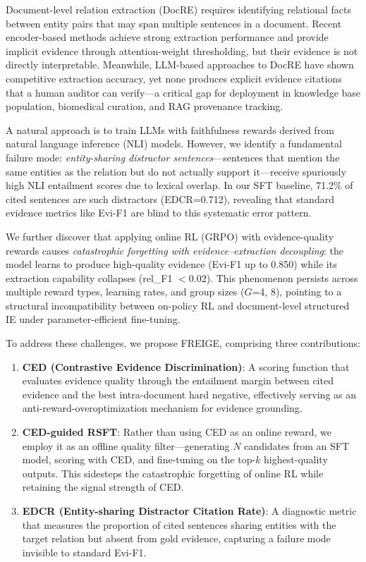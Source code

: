 \documentclass[11pt,a4paper]{article}
\newcommand{\method}{FREIGE}
\newcommand{\ced}{CED}
\newcommand{\edcr}{EDCR}
\newcommand{\rsft}{RSFT}
\begin{document}
Document-level relation extraction (DocRE) requires identifying relational facts between entity pairs that may span multiple sentences in a document.
Recent encoder-based methods achieve strong extraction performance and provide implicit evidence through attention-weight thresholding, but their evidence is not directly interpretable.
Meanwhile, LLM-based approaches to DocRE have shown competitive extraction accuracy, yet none produces explicit evidence citations that a human auditor can verify---a critical gap for deployment in knowledge base population, biomedical curation, and RAG provenance tracking.

A natural approach is to train LLMs with faithfulness rewards derived from natural language inference (NLI) models.
However, we identify a fundamental failure mode: \emph{entity-sharing distractor sentences}---sentences that mention the same entities as the relation but do not actually support it---receive spuriously high NLI entailment scores due to lexical overlap.
In our SFT baseline, 71.2\% of cited sentences are such distractors (\edcr{}=0.712), revealing that standard evidence metrics like Evi-F1 are blind to this systematic error pattern.

We further discover that applying online RL (GRPO) with evidence-quality rewards causes \emph{catastrophic forgetting with evidence--extraction decoupling}: the model learns to produce high-quality evidence (Evi-F1 up to 0.850) while its extraction capability collapses (rel\_F1 $< 0.02$).
This phenomenon persists across multiple reward types, learning rates, and group sizes ($G$=4, 8), pointing to a structural incompatibility between on-policy RL and document-level structured IE under parameter-efficient fine-tuning.

To address these challenges, we propose \method{}, comprising three contributions:

\begin{enumerate}
\item \textbf{\ced{} (Contrastive Evidence Discrimination)}: A scoring function that evaluates evidence quality through the entailment margin between cited evidence and the best intra-document hard negative, effectively serving as an anti-reward-overoptimization mechanism for evidence grounding.

\item \textbf{\ced{}-guided \rsft{}}: Rather than using \ced{} as an online reward, we employ it as an offline quality filter---generating $N$ candidates from an SFT model, scoring with \ced{}, and fine-tuning on the top-$k$ highest-quality outputs. This sidesteps the catastrophic forgetting of online RL while retaining the signal strength of \ced{}.

\item \textbf{\edcr{} (Entity-sharing Distractor Citation Rate)}: A diagnostic metric that measures the proportion of cited sentences sharing entities with the target relation but absent from gold evidence, capturing a failure mode invisible to standard Evi-F1.
\end{enumerate}
\end{document}

